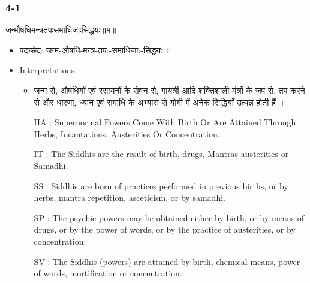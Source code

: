 \begin{frame}[fragile]\frametitle{4-1}
\begin{sanskrit}
जन्मौषधिमन्त्रतपःसमाधिजाःसिद्धयः॥१॥
\end{sanskrit}

	\begin{itemize}
	\item पदच्छेद:  जन्म-औषधि-मन्त्र-तप:-समाधिजा:-सिद्धयः ॥
	\item Interpretations
		\begin{itemize}	
		\item जन्म से, औषधियों एवं रसायनों के सेवन से, गायत्री आदि शक्तिशाली मंत्रों के जप से, तप करने से और धारणा, ध्यान एवं समाधि के अभ्यास से योगी में अनेक सिद्धियाँ उत्पन्न होती हैं ।
		\item [HA]: Supernormal Powers Come With Birth Or Are Attained Through Herbs, Incantations, Austerities Or Concentration.
		\item [IT]: The Siddhis are the result of birth, drugs, Mantras austerities or Samadhi.
		\item [SS]: Siddhis are born of practices performed in previous births, or by herbs, mantra repetition, asceticism, or by samadhi.
		\item [SP]: The psychic powers may be obtained either by birth, or by means of drugs, or by the power of words, or by the practice of austerities, or by concentration.
		\item [SV]: The Siddhis (powers) are attained by birth, chemical means, power of words, mortification or concentration. 
		\end{itemize}
	\end{itemize}
\end{frame}


